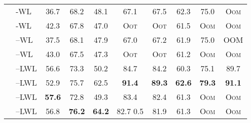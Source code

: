 \documentclass{article}
\theoremstyle{definition}
\begin{document}
\begin{table}[t]
{\begin{tabular}{@{}c <{\enspace}@{}lcccccccc@{}}
			\cmidrule{2-10}	
			\multirow{4}{*}{\rotatebox{90}{Global}} 	&
			\textsf{-WL}        &   36.7   \scriptsize   &  68.2  \scriptsize  &  48.1  \scriptsize    &       67.1 \scriptsize   &  67.5  \scriptsize   & 62.3 \scriptsize   &  75.0   \scriptsize   & \textsc{Oom} \\
			&  \textsf{-WL}        	&    42.3 \scriptsize & 67.8 \scriptsize  & 47.0   \scriptsize  &\textsc{Oot} &\textsc{Oot} & 61.5    \scriptsize  &\textsc{Oom} & \textsc{Oom} \\            
			\cmidrule{2-10}			
			& \textsf{--WL}  	& 37.5  \scriptsize    &  68.1   \scriptsize &   47.9     \scriptsize   &      67.0    \scriptsize   &  67.2   \scriptsize  &   61.9  \scriptsize  & 75.0 \scriptsize   & \textsc{OOM} \\  
			& \textsf{--WL}          		& 43.0  \scriptsize & 67.5 \scriptsize  &  47.3 \scriptsize  &\textsc{Oot} &\textsc{Oot} &   61.2  \scriptsize  &\textsc{Oom} & \textsc{Oom} \\                                                   
			\cmidrule{2-10}		
			\multirow{4}{*}{\rotatebox{90}{Local}}    		
			& \textsf{--LWL}         	& 56.6    \scriptsize  &  73.3 \scriptsize   & 50.2 \scriptsize  & 84.7 \scriptsize  &   84.2   \scriptsize   & 60.3   \scriptsize  &   75.1  \scriptsize  & 89.7 \scriptsize          \\      		
			& \textsf{--LWL}         	&  52.9  \scriptsize  &  75.7 \scriptsize  &  62.5   \scriptsize  &   \bf{91.4}   \scriptsize   &  \bf{89.3}        \scriptsize  &  \bf{62.6}  \scriptsize  &   \textbf{79.3}    \scriptsize &   \bf{91.1}    \scriptsize  \\     
			& \textsf{--LWL} 	&  \bf{57.6}   \scriptsize  & 72.8 \scriptsize  &   49.3     \scriptsize   &  83.4   \scriptsize  &  82.4   \scriptsize   &    61.3    \scriptsize  & \textsc{Oom} & \textsc{Oom} \\ 	
			& \textsf{--LWL}         	& 56.8   \scriptsize  &  \bf{76.2}     \scriptsize  & \bf{64.2}       \scriptsize   &  82.7   \scriptsize  0.5 &  81.9   \scriptsize  & 61.3 \scriptsize  & \textsc{Oom}& \textsc{Oom} \\    
			\bottomrule
	\end{tabular}}
\end{table}	
	
\end{document}
